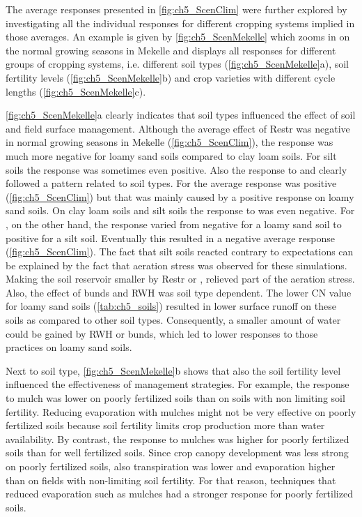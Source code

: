 The average responses presented in \autoref{fig:ch5_ScenClim} were further explored by investigating all the individual responses for different cropping systems implied in those averages. An example is given by \autoref{fig:ch5_ScenMekelle} which zooms in on the normal growing seasons in Mekelle and displays all responses for different groups of cropping systems, i.e. different soil types (\autoref{fig:ch5_ScenMekelle}a), soil fertility levels (\autoref{fig:ch5_ScenMekelle}b) and crop varieties with different cycle lengths (\autoref{fig:ch5_ScenMekelle}c). 

\autoref{fig:ch5_ScenMekelle}a clearly indicates that soil types influenced the effect of soil and field surface management. Although the average effect of Restr was negative in normal growing seasons in Mekelle (\autoref{fig:ch5_ScenClim}), the response was much more negative for loamy sand soils compared to clay loam soils. For silt soils the response was sometimes even positive. Also the response to \TAWp and \TAWm clearly followed a pattern related to soil types. For \TAWp the average response was positive (\autoref{fig:ch5_ScenClim}) but that was mainly caused by a positive response on loamy sand soils. On clay loam soils and silt soils the response to \TAWp was even negative. For \TAWm, on the other hand, the response varied from negative for a loamy sand soil to positive for a silt soil. Eventually this resulted in a negative average response (\autoref{fig:ch5_ScenClim}). The fact that silt soils reacted contrary to expectations can be explained by the fact that aeration stress was observed for these simulations. Making the soil reservoir smaller by Restr or \TAWm, relieved part of the aeration stress. Also, the effect of bunds and RWH was soil type dependent. The lower CN value for loamy sand soils (\autoref{tab:ch5_soils}) resulted in lower surface runoff on these soils as compared to other soil types. Consequently, a smaller amount of water could be gained by RWH or bunds, which led to lower responses to those practices on loamy sand soils. 

Next to soil type, \autoref{fig:ch5_ScenMekelle}b shows that also the soil fertility level influenced the effectiveness of management strategies. For example, the \Y response to mulch was lower on poorly fertilized soils than on soils with non limiting soil fertility. Reducing evaporation with mulches might not be very effective on poorly fertilized soils because soil fertility limits crop production more than water availability. By contrast, the \WPET response to mulches was higher for poorly fertilized soils than for well fertilized soils. Since crop canopy development was less strong on poorly fertilized soils, also transpiration was lower and evaporation higher than on fields with non-limiting soil fertility. For that reason, techniques that reduced evaporation such as mulches had a stronger \WPET response for poorly fertilized soils. 

